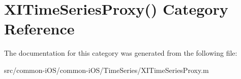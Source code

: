 \hypertarget{category_x_i_time_series_proxy_07_08}{}\section{X\+I\+Time\+Series\+Proxy() Category Reference}
\label{category_x_i_time_series_proxy_07_08}


The documentation for this category was generated from the following file\+:\begin{DoxyCompactItemize}
\item 
src/common-\/i\+O\+S/common-\/i\+O\+S/\+Time\+Series/X\+I\+Time\+Series\+Proxy.\+m\end{DoxyCompactItemize}
